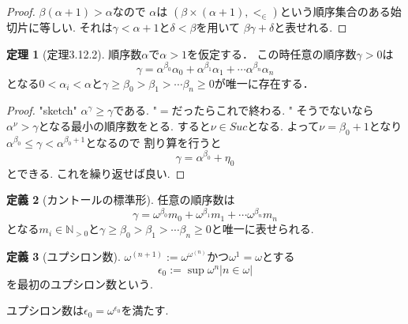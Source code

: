 \documentclass[dvipdfmx,a4paper,11pt]{article}
\newcommand{\N}{\mathbb{N}}
\theoremstyle{definition}
\newtheorem{thm}{定理}
\newtheorem{dfn}[thm]{定義}
\begin{document}
\begin{proof}
$\beta(\alpha + 1) > \alpha$なので
$\alpha$は
$(\beta \times (\alpha+1), <_{\in})$という順序集合のある始切片に等しい.
それは$\gamma < \alpha + 1$と$\delta < \beta$を用いて
$\beta \gamma + \delta$と表せれる. 
\end{proof}

 \begin{tcolorbox}
 [colback = white, colframe = green!35!black, fonttitle = \bfseries,breakable = true]
\begin{thm}[定理3.12.2]
順序数$\alpha$で$\alpha>1$を仮定する．
この時任意の順序数$\gamma >0$は
$$
\gamma = \alpha^{\beta_0}\alpha_{0} +  \alpha^{\beta_1}\alpha_{1} +\cdots \alpha^{\beta_n}\alpha_{n}
$$
となる$0 < \alpha_i < \alpha$と$\gamma \ge \beta_{0}>\beta_1>\cdots \beta_{n} \ge 0$が唯一に存在する． 
\end{thm}
\end{tcolorbox}

\begin{proof}
"sketch" $\alpha^{\gamma}\ge \gamma$である. "$=$だったらこれで終わる. "
そうでないなら$\alpha^{\nu} > \gamma$となる最小の順序数をとる. すると$\nu \in Suc$となる.
よって$\nu = \beta_0 +1$となり
$\alpha^{\beta_0} \le \gamma < \alpha^{\beta_0 +1}$となるので
割り算を行うと
$$
\gamma = \alpha^{\beta_0} +  \eta_{0}
$$
とできる. これを繰り返せば良い. 
\end{proof}

 \begin{tcolorbox}
 [colback = white, colframe = green!35!black, fonttitle = \bfseries,breakable = true]
\begin{dfn}[カントールの標準形]
任意の順序数は
$$
\gamma = 
\omega^{\beta_0}m_{0} +  \omega^{\beta_1}m_{1} +\cdots \omega^{\beta_n}m_{n}
$$
となる$m_i \in \N_{>0}$と$\gamma \ge \beta_{0}>\beta_1>\cdots \beta_{n} \ge 0$と唯一に表せられる. 
\end{dfn}
\end{tcolorbox}

 \begin{tcolorbox}
 [colback = white, colframe = green!35!black, fonttitle = \bfseries,breakable = true]
\begin{dfn}[ユプシロン数]
$\omega^{(n+1)}:=\omega^{\omega^{(n)}}$かつ$\omega^{1}=\omega$とする
$$
\epsilon_0 := \sup{ \omega^{n} | n \in \omega|}
$$
を最初のユプシロン数という. 
\end{dfn}
ユプシロン数は$\epsilon_0 = \omega^{\epsilon_0 }$を満たす. 
\end{tcolorbox}
\end{document}
